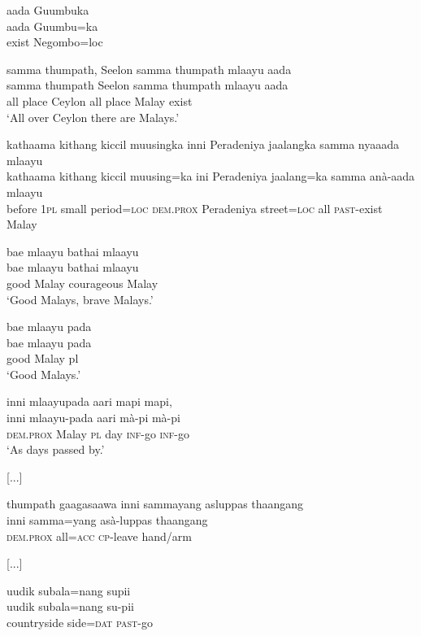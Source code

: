 \ea \label{K051222nar04.26}
\glll
 aada Guumbuka\\
 aada Guumbu=ka\\
 exist Negombo=loc\\

\z


\ea \label{K051222nar04.27}
\glll
 samma thumpath, Seelon samma thumpath mlaayu aada\\
 samma thumpath Seelon samma thumpath mlaayu aada\\
 all place Ceylon all place Malay exist\\
`All over Ceylon there are Malays.'
\z


\ea \label{K051222nar04.28}
\glll
 kathaama kithang kiccil muusingka inni Peradeniya jaalangka samma nyaaada mlaayu\\
 kathaama kithang kiccil muusing=ka ini Peradeniya jaalang=ka samma anà-aada mlaayu\\
 before \textsc{1pl} small period=\textsc{loc} \textsc{dem.prox} Peradeniya street=\textsc{loc} all \textsc{past}-exist Malay\\
\z


\ea \label{K051222nar04.29}
\glll
 bae mlaayu bathai mlaayu\\
 bae mlaayu bathai mlaayu\\
 good Malay courageous Malay\\
`Good Malays, brave Malays.'
\z


\ea \label{K051222nar04.30}
\glll
 bae mlaayu pada\\
 bae mlaayu pada\\
 good Malay  pl\\
`Good Malays.'
\z


\ea \label{K051222nar04.31}
\glll
 inni mlaayupada aari mapi mapi, \\
 inni mlaayu-pada aari mà-pi mà-pi  \\
 \textsc{dem.prox} Malay \textsc{pl} day \textsc{inf}-go \textsc{inf}-go \\
`As days passed by.'
\z

[...]

\ea \label{K051222nar04.34}
\glll
 thumpath gaagasaawa  inni sammayang asluppas thaangang\\
 inni samma=yang asà-luppas thaangang\\
 \textsc{dem.prox} all=\textsc{acc} \textsc{cp}-leave hand/arm\\
\z

[...]

\ea \label{K051222nar04.36}
\glll
 uudik subala=nang supii\\
 uudik subala=nang su-pii\\
 countryside side=\textsc{dat} \textsc{past}-go\\
\z


